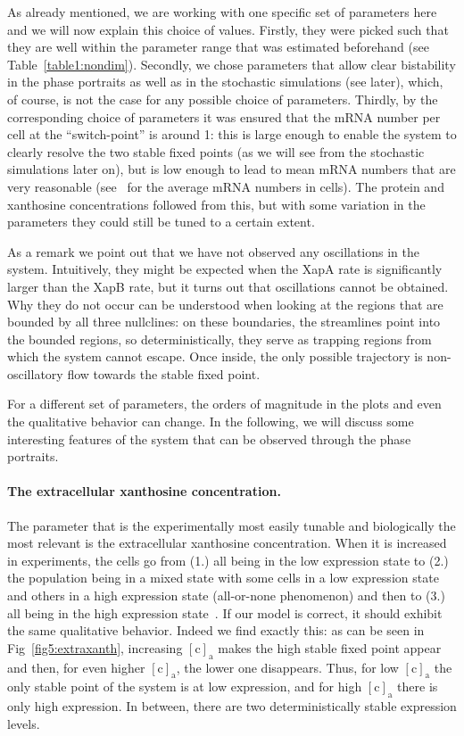 \documentclass[10pt,letterpaper]{article}
\newcommand{\n}[1]{\mathrm{#1}}
\begin{document}
	As already mentioned, we are working with one specific set of parameters
	here and we will now explain this choice of values. Firstly, they were
	picked such that they are well within the parameter range that was estimated beforehand (see Table~\ref{table1:nondim}). Secondly, we
	chose parameters that allow clear bistability in the phase portraits as well as in the
	stochastic simulations (see later), which, of course, is not the case for any possible choice of parameters. Thirdly, by the corresponding choice of
	parameters it was ensured that the mRNA number per cell at the
	``switch-point'' is around 1: this is large enough to enable the system to
	clearly resolve the two stable fixed points (as we will see from the
	stochastic simulations later on), but is low enough to lead to mean mRNA
	numbers that are very reasonable (see~\cite{Milo2016} for the average mRNA
	numbers in cells). The protein and xanthosine
	concentrations followed from this, but with some variation in the parameters
	they could still be tuned to a certain extent.
	
	As a remark we point out that we have not observed any oscillations in the
	system. Intuitively, they might be expected when the XapA rate is
	significantly larger than the XapB rate, but it turns out that oscillations
	cannot be obtained. Why they do not occur can be understood when looking at the regions that
	are bounded by all three nullclines: on these boundaries, the streamlines
	point into the bounded regions, so deterministically, they serve as
	trapping regions from which the system cannot escape. Once inside, the only
	possible trajectory is non-oscillatory flow towards the stable fixed point.
	
	For a different set of parameters, the orders of magnitude in the plots and
	even the qualitative behavior can change. In the following, we will discuss
	some interesting features of the system that can be observed through the
	phase portraits. 
	
	\paragraph*{The extracellular xanthosine concentration.}
	The parameter that is the experimentally most easily tunable and
	biologically the most relevant is the extracellular xanthosine
	concentration. When it is increased in experiments, the cells go from (1.) all
	being in the low expression state to (2.) the population being in a mixed state with some cells in a low expression state and others in a high expression state (all-or-none phenomenon) and then to (3.) all being in the high
	expression state~\cite{Chure2019}. If our model is correct, it should
	exhibit the same qualitative behavior. Indeed we find exactly this: as can
	be seen in Fig~\ref{fig5:extraxanth}, increasing $\n{[c]_a}$ makes the high
	stable fixed point appear and then, for even higher $\n{[c]_a}$, the lower
	one disappears. Thus, for low $\n{[c]_a}$ the only stable point of the system
	is at low expression, and for high $\n{[c]_a}$ there is only high
	expression. In between, there are two deterministically stable expression
	levels.
	
\end{document}
